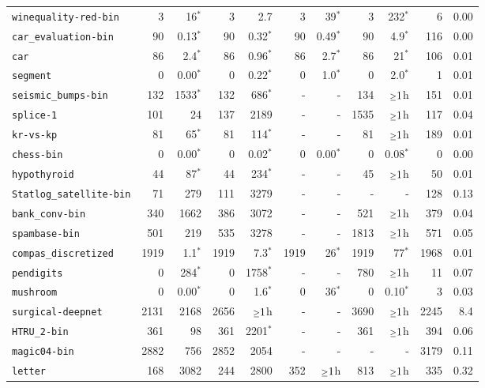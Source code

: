 \begin{tabular}{lrrrrrrrrrr}
\texttt{winequality-red-bin} & 3 & 16$^*$ & 3 & 2.7 & 3 & 39$^*$ & 3 & 232$^*$ & 6 & 0.00\\
\texttt{car\_evaluation-bin} & 90 & 0.13$^*$ & 90 & 0.32$^*$ & 90 & 0.49$^*$ & 90 & 4.9$^*$ & 116 & 0.00\\
\texttt{car} & 86 & 2.4$^*$ & 86 & 0.96$^*$ & 86 & 2.7$^*$ & 86 & 21$^*$ & 106 & 0.01\\
\texttt{segment} & 0 & 0.00$^*$ & 0 & 0.22$^*$ & 0 & 1.0$^*$ & 0 & 2.0$^*$ & 1 & 0.01\\
\texttt{seismic\_bumps-bin} & 132 & 1533$^*$ & 132 & 686$^*$ & - & - & 134 & $\mathsmaller{\geq}1$h & 151 & 0.01\\
\texttt{splice-1} & 101 & 24 & 137 & 2189 & - & - & 1535 & $\mathsmaller{\geq}1$h & 117 & 0.04\\
\texttt{kr-vs-kp} & 81 & 65$^*$ & 81 & 114$^*$ & - & - & 81 & $\mathsmaller{\geq}1$h & 189 & 0.01\\
\texttt{chess-bin} & 0 & 0.00$^*$ & 0 & 0.02$^*$ & 0 & 0.00$^*$ & 0 & 0.08$^*$ & 0 & 0.00\\
\texttt{hypothyroid} & 44 & 87$^*$ & 44 & 234$^*$ & - & - & 45 & $\mathsmaller{\geq}1$h & 50 & 0.01\\
\texttt{Statlog\_satellite-bin} & 71 & 279 & 111 & 3279 & - & - & - & - & 128 & 0.13\\
\texttt{bank\_conv-bin} & 340 & 1662 & 386 & 3072 & - & - & 521 & $\mathsmaller{\geq}1$h & 379 & 0.04\\
\texttt{spambase-bin} & 501 & 219 & 535 & 3278 & - & - & 1813 & $\mathsmaller{\geq}1$h & 571 & 0.05\\
\texttt{compas\_discretized} & 1919 & 1.1$^*$ & 1919 & 7.3$^*$ & 1919 & 26$^*$ & 1919 & 77$^*$ & 1968 & 0.01\\
\texttt{pendigits} & 0 & 284$^*$ & 0 & 1758$^*$ & - & - & 780 & $\mathsmaller{\geq}1$h & 11 & 0.07\\
\texttt{mushroom} & 0 & 0.00$^*$ & 0 & 1.6$^*$ & 0 & 36$^*$ & 0 & 0.10$^*$ & 3 & 0.03\\
\texttt{surgical-deepnet} & 2131 & 2168 & 2656 & $\mathsmaller{\geq}1$h & - & - & 3690 & $\mathsmaller{\geq}1$h & 2245 & 8.4\\
\texttt{HTRU\_2-bin} & 361 & 98 & 361 & 2201$^*$ & - & - & 361 & $\mathsmaller{\geq}1$h & 394 & 0.06\\
\texttt{magic04-bin} & 2882 & 756 & 2852 & 2054 & - & - & - & - & 3179 & 0.11\\
\texttt{letter} & 168 & 3082 & 244 & 2800 & 352 & $\mathsmaller{\geq}1$h & 813 & $\mathsmaller{\geq}1$h & 335 & 0.32\\

\end{tabular}
